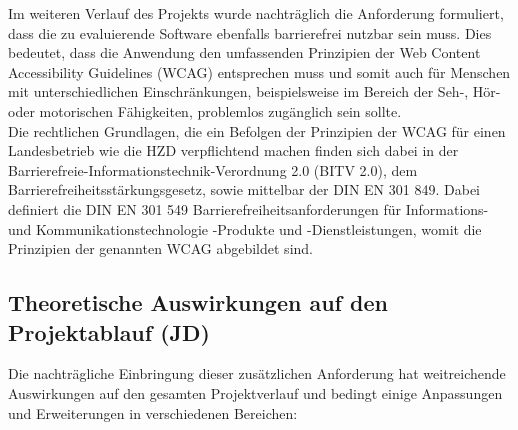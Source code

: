 \documentclass[ThesisDJ.tex]{subfiles}
\begin{document}
Im weiteren Verlauf des Projekts wurde nachträglich die Anforderung formuliert, dass die zu evaluierende Software ebenfalls barrierefrei nutzbar sein muss. Dies bedeutet, dass die Anwendung den umfassenden Prinzipien der Web Content Accessibility Guidelines (WCAG)\cite{Kirkpatrick2018WCAG21} entsprechen muss und somit auch für Menschen mit unterschiedlichen Einschränkungen, beispielsweise im Bereich der Seh-, Hör- oder motorischen Fähigkeiten, problemlos zugänglich sein sollte.\\
Die rechtlichen Grundlagen, die ein Befolgen der Prinzipien der WCAG für einen Landesbetrieb wie die HZD verpflichtend machen finden sich dabei in der Barrierefreie-Informationstechnik-Verordnung 2.0 (BITV 2.0)\cite{bitv2}, dem Barrierefreiheitsstärkungsgesetz\cite{bfsg}, sowie mittelbar der DIN EN 301 849\cite{din301549}. Dabei definiert die DIN EN 301 549 Barrierefreiheitsanforderungen für Informations- und Kommunikationstechnologie -Produkte und -Dienstleistungen, womit die Prinzipien der genannten WCAG abgebildet sind.

\subsection{Theoretische Auswirkungen auf den Projektablauf (JD)}
Die nachträgliche Einbringung dieser zusätzlichen Anforderung hat weitreichende Auswirkungen auf den gesamten Projektverlauf und bedingt einige Anpassungen und Erweiterungen in verschiedenen Bereichen:
\end{document}

